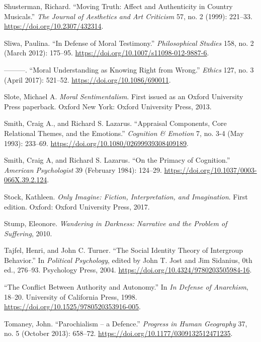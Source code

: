 \documentclass[
  12pt,
]{book}
\newlength{\cslhangindent}
\newenvironment{CSLReferences}[2] %
 {\begin{list}{}{%
  \setlength{\itemindent}{0pt}
  \setlength{\leftmargin}{0pt}
  \setlength{\parsep}{0pt}
  \ifodd #1
   \setlength{\leftmargin}{\cslhangindent}
   \setlength{\itemindent}{-1\cslhangindent}
  \fi
  \setlength{\itemsep}{#2\baselineskip}}}
 {\end{list}}
\theoremstyle{definition}
\theoremstyle{definition}
\theoremstyle{definition}
\theoremstyle{definition}
\theoremstyle{remark}
\begin{document}
\begin{CSLReferences}{1}{0}
Shusterman, Richard. {``Moving {Truth}: {Affect} and {Authenticity} in {Country Musicals}.''} \emph{The Journal of Aesthetics and Art Criticism} 57, no. 2 (1999): 221--33. \url{https://doi.org/10.2307/432314}.

Sliwa, Paulina. {``In Defense of Moral Testimony.''} \emph{Philosophical Studies} 158, no. 2 (March 2012): 175--95. \url{https://doi.org/10.1007/s11098-012-9887-6}.

---------. {``Moral {Understanding} as {Knowing Right} from {Wrong}.''} \emph{Ethics} 127, no. 3 (April 2017): 521--52. \url{https://doi.org/10.1086/690011}.

Slote, Michael A. \emph{Moral {Sentimentalism}}. First issued as an Oxford University Press paperback. Oxford New York: Oxford University Press, 2013.

Smith, Craig A., and Richard S. Lazarus. {``Appraisal {Components}, {Core Relational Themes}, and the {Emotions}.''} \emph{Cognition \& Emotion} 7, no. 3-4 (May 1993): 233--69. \url{https://doi.org/10.1080/02699939308409189}.

Smith, Craig A, and Richard S. Lazarus. {``On the {Primacy} of {Cognition}.''} \emph{American Psychologist} 39 (February 1984): 124--29. \url{https://doi.org/10.1037/0003-066X.39.2.124}.

Stock, Kathleen. \emph{Only Imagine: Fiction, Interpretation, and Imagination}. First edition. Oxford: Oxford University Press, 2017.

Stump, Eleonore. \emph{Wandering in {Darkness}: {Narrative} and the {Problem} of {Suffering}}, 2010.

Tajfel, Henri, and John C. Turner. {``The {Social Identity Theory} of {Intergroup Behavior}.''} In \emph{Political {Psychology}}, edited by John T. Jost and Jim Sidanius, 0th ed., 276--93. Psychology Press, 2004. \url{https://doi.org/10.4324/9780203505984-16}.

{``The {Conflict Between Authority} and {Autonomy}.''} In \emph{In {Defense} of {Anarchism}}, 18--20. University of California Press, 1998. \url{https://doi.org/10.1525/9780520353916-005}.

Tomaney, John. {``Parochialism -- a Defence.''} \emph{Progress in Human Geography} 37, no. 5 (October 2013): 658--72. \url{https://doi.org/10.1177/0309132512471235}.


\end{CSLReferences}
\end{document}

